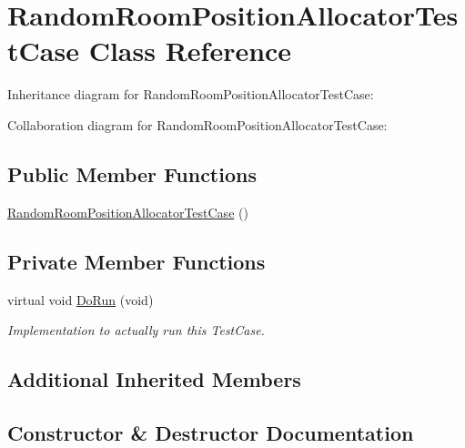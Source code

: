 \hypertarget{classRandomRoomPositionAllocatorTestCase}{}\section{Random\+Room\+Position\+Allocator\+Test\+Case Class Reference}
\label{classRandomRoomPositionAllocatorTestCase}


Inheritance diagram for Random\+Room\+Position\+Allocator\+Test\+Case\+:


Collaboration diagram for Random\+Room\+Position\+Allocator\+Test\+Case\+:
\subsection*{Public Member Functions}
\begin{DoxyCompactItemize}
\item 
\hyperlink{classRandomRoomPositionAllocatorTestCase_ade4a42534b714efc2d5d46362181957f}{Random\+Room\+Position\+Allocator\+Test\+Case} ()
\end{DoxyCompactItemize}
\subsection*{Private Member Functions}
\begin{DoxyCompactItemize}
\item 
virtual void \hyperlink{classRandomRoomPositionAllocatorTestCase_ae386f6e4ee1b786b018786ee9be7e969}{Do\+Run} (void)
\begin{DoxyCompactList}\small\item\em Implementation to actually run this Test\+Case. \end{DoxyCompactList}\end{DoxyCompactItemize}
\subsection*{Additional Inherited Members}


\subsection{Constructor \& Destructor Documentation}
